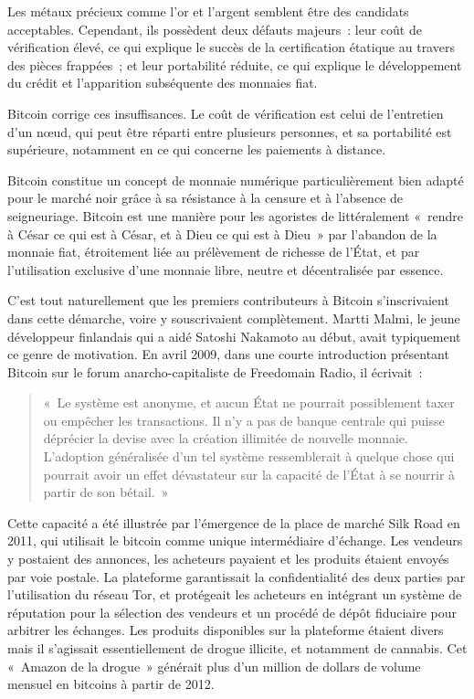Les métaux précieux comme l'or et l'argent semblent être des candidats acceptables. Cependant, ils possèdent deux défauts majeurs~: leur coût de vérification élevé, ce qui explique le succès de la certification étatique au travers des pièces frappées~; et leur portabilité réduite, ce qui explique le développement du crédit et l'apparition subséquente des monnaies fiat.

Bitcoin corrige ces insuffisances. Le coût de vérification est celui de l'entretien d'un nœud, qui peut être réparti entre plusieurs personnes, et sa portabilité est supérieure, notamment en ce qui concerne les paiements à distance.

Bitcoin constitue un concept de monnaie numérique particulièrement bien adapté pour le marché noir grâce à sa résistance à la censure et à l'absence de seigneuriage. Bitcoin est une manière pour les agoristes de littéralement «~rendre à César ce qui est à César, et à Dieu ce qui est à Dieu~» par l'abandon de la monnaie fiat, étroitement liée au prélèvement de richesse de l'État, et par l'utilisation exclusive d'une monnaie libre, neutre et décentralisée par essence.

C'est tout naturellement que les premiers contributeurs à Bitcoin s'inscrivaient dans cette démarche, voire y souscrivaient complètement. Martti Malmi, le jeune développeur finlandais qui a aidé Satoshi Nakamoto au début, avait typiquement ce genre de motivation. En avril 2009, dans une courte introduction présentant Bitcoin sur le forum anarcho-capitaliste de Freedomain Radio, il écrivait~:

\begin{quote}
«~Le système est anonyme, et aucun État ne pourrait possiblement taxer ou empêcher les transactions. Il n'y a pas de banque centrale qui puisse déprécier la devise avec la création illimitée de nouvelle monnaie. L'adoption généralisée d'un tel système ressemblerait à quelque chose qui pourrait avoir un effet dévastateur sur la capacité de l'État à se nourrir à partir de son bétail.~»
\end{quote}

Cette capacité a été illustrée par l'émergence de la place de marché Silk Road en 2011, qui utilisait le bitcoin comme unique intermédiaire d'échange. Les vendeurs y postaient des annonces, les acheteurs payaient et les produits étaient envoyés par voie postale. La plateforme garantissait la confidentialité des deux parties par l'utilisation du réseau Tor, et protégeait les acheteurs en intégrant un système de réputation pour la sélection des vendeurs et un procédé de dépôt fiduciaire pour arbitrer les échanges. Les produits disponibles sur la plateforme étaient divers mais il s'agissait essentiellement de drogue illicite, et notamment de cannabis. Cet «~Amazon de la drogue~» générait plus d'un million de dollars de volume mensuel en bitcoins à partir de 2012.

